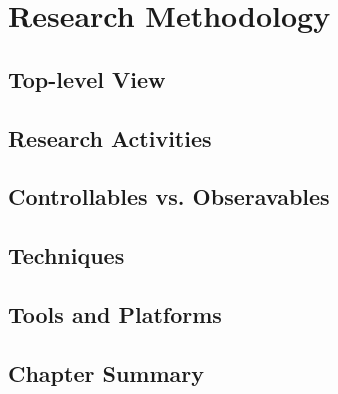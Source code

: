 \chapter{Research Methodology}
\label{chap:method}
\section{Top-level View}
\section{Research Activities}
\section{Controllables vs. Obseravables}
\section{Techniques}
\section{Tools and Platforms}
\section{Chapter Summary}